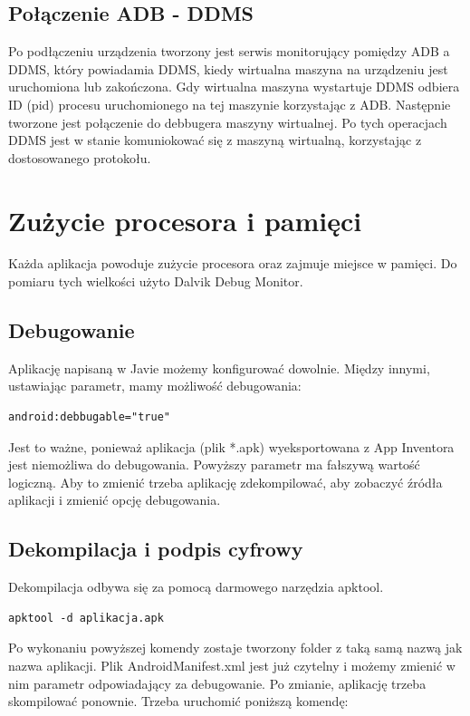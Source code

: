\subsection{Połączenie ADB - DDMS}

Po podłączeniu urządzenia tworzony jest serwis monitorujący pomiędzy ADB a DDMS, który powiadamia DDMS, kiedy wirtualna maszyna na urządzeniu jest uruchomiona lub zakończona. Gdy wirtualna maszyna wystartuje DDMS odbiera ID (pid) procesu uruchomionego na tej maszynie korzystając z ADB. Następnie tworzone jest połączenie do debbugera maszyny wirtualnej. Po tych operacjach DDMS jest w stanie komuniokować się z maszyną wirtualną, korzystając z dostosowanego protokołu.\cite{doc:ddms}



\section{Zużycie procesora i pamięci}

Każda aplikacja powoduje zużycie procesora oraz zajmuje miejsce w pamięci. Do pomiaru tych wielkości użyto Dalvik Debug Monitor.

\subsection{Debugowanie}
Aplikację napisaną w Javie możemy konfigurować dowolnie. Między innymi, ustawiając parametr, mamy możliwość debugowania: 

\begin{lstlisting}
android:debbugable="true"
\end{lstlisting}

Jest to ważne, ponieważ aplikacja (plik *.apk) wyeksportowana z App Inventora jest niemożliwa do debugowania. Powyższy parametr ma fałszywą wartość logiczną. Aby to zmienić trzeba aplikację zdekompilować, aby zobaczyć źródła aplikacji i zmienić opcję debugowania. 

\subsection{Dekompilacja i podpis cyfrowy}
Dekompilacja odbywa się za pomocą darmowego narzędzia apktool.

\begin{lstlisting}
apktool -d aplikacja.apk
\end{lstlisting}

Po wykonaniu powyższej komendy zostaje tworzony folder z taką samą nazwą jak nazwa aplikacji. Plik AndroidManifest.xml jest już czytelny i możemy zmienić w nim parametr odpowiadający za debugowanie. Po zmianie, aplikację trzeba skompilować ponownie. Trzeba uruchomić poniższą komendę:

